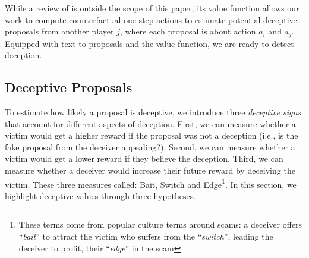 While a review of \cicero is outside the scope of this paper, its value function allows our work to compute counterfactual one-step actions to estimate potential deceptive proposals from another player \( j \), where each proposal is about action \( a_i \) and \( a_j \). Equipped with text-to-proposals and the  value function, we are ready to detect deception. 

\subsection{Deceptive Proposals}
\label{sec:dec_prop}

To estimate how likely a proposal is deceptive, we introduce three \textit{deceptive signs} that account for different aspects of deception.
First, we can measure whether a victim would get a higher reward if the proposal was not a deception (i.e., is the fake proposal from the deceiver appealing?). Second, we can measure whether a victim would get a lower reward if they believe the deception.
Third, we can measure whether a deceiver would increase their future reward by deceiving the victim. These three measures called: Bait, Switch and Edge\footnote{These terms come from popular culture terms around scams: a deceiver offers ``\textit{bait}'' to attract the victim who suffers from the ``\textit{switch}'', leading the deceiver to profit, their ``\textit{edge}'' in the scam}.
In this section, we highlight deceptive values through three hypotheses.

